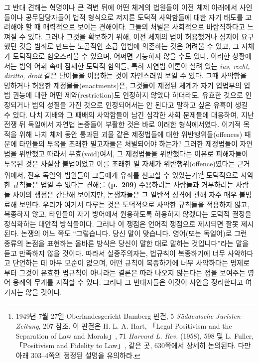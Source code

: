 그 반대 견해는 혁명이나 큰 격변 뒤에 어떤 체계의 법원들이 이전 체제
아래에서 사인들이나 공무담당자들이 법적 형식으로 저지른 도덕적
사악함들에 대한 자기 태도를 고려해야 할 때 매력적으로 보이는 견해이다.
그들의 처벌은 사회적으로 바람직하다고 느껴질 수 있다. 그러나 그것을
확보하기 위해, 이전 체제의 법이 허용했거나 심지어 요구했던 것을 범죄로
만드는 노골적인 소급 입법에 의존하는 것은 어려울 수 있고, 그 자체가
도덕적으로 혐오스러울 수 있으며, 어쩌면 가능하지 않을 수도 있다. 이러한
상황에서는 법의 어휘 속에 잠재한 도덕적 함의들, 특히 자연법 이론이 실려
있는 \emph{ius, recht, diritto, droit} 같은 단어들을 이용하는 것이
자연스러워 보일 수 있다. 그때 사악함을 명하거나 허용한
제정물들(enactments)은, 그것들이 제정된 체계가 자기 입법부의 입법 권능에
대한 어떤 제약(restriction)도 인정하지 않았다 하더라도, 유효한 것으로
인정되거나 법의 성질을 가진 것으로 인정되어서는 안 된다고 말하고 싶은
유혹이 생길 수 있다. 나치 지배와 그 패배의 사악함들이 남긴 심각한 사회
문제들에 대응하여, 지난 전쟁 뒤 독일에서 자연법 논증들이 부활한 것은
바로 이러한 형식에서였다. 이기적 목적을 위해 나치 체제 동안 통과된 괴물
같은 제정법들에 대한 위반행위들(offences) 때문에 타인들의 투옥을 초래한
밀고자들은 처벌되어야 하는가? 그러한 제정법들이 자연법을 위반했고 따라서
무효(void)여서, 그 제정법들을 위반했다는 이유로 피해자들이 투옥된 것은
사실상 불법이었고 이를 초래한 일 자체가 위반행위(offence)였다는 근거
위에서, 전후 독일의 법원들이 그들에게 유죄를 선고할 수
있었는가?\footnote{1949년 7월 27일 Oberlandesgericht Bamberg 판결, 5
  \emph{Süddeutsche Juristen-Zeitung}, 207 참조. 이 판결은 H. L. A.
  Hart, 「Legal Positivism and the Separation of Law and Morals」, 71
  \emph{Harvard L. Rev.} (1958), 598 및 L. Fuller, 「Positivism and
  Fidelity to Law」, 같은 곳, 630쪽에서 상세히 논의된다. 다만 아래
  303--4쪽의 정정된 설명을 유의하라.} 도덕적으로 사악한 규칙들은 법일 수
없다는 견해를 \textbf{(p.~209)} 수용하려는 사람들과 거부하려는 사람들
사이의 쟁점은 간단해 보이지만, 논쟁자들은 그 일반적 성격에 관해 자주
매우 불명료해 보인다. 우리가 여기서 다루는 것은 도덕적으로 사악한
규칙들을 적용하지 않고, 복종하지 않고, 타인들이 자기 방어에서 원용하도록
허용하지 않겠다는 도덕적 결정을 정식화하는 대안적 방식들이다. 그러나 이
쟁점은 언어적 쟁점으로 제시되면 잘못 제시된다. 논쟁의 어느 쪽도
“그렇습니다. 당신 말이 맞습니다. 영어(또는 독일어)로 그런 종류의 논점을
표현하는 올바른 방식은 당신이 말한 대로 말하는 것입니다”라는 말을 듣고
만족하지 않을 것이다. 따라서 실증주의자는, 법규칙이 복종하기에 너무
사악하다고 단언하는 데 아무 모순이 없으며, 어떤 규칙이 복종하기에 너무
사악하다는 명제로부터 그것이 유효한 법규칙이 아니라는 결론은 따라 나오지
않는다는 점을 보여주는 영어 용례의 무게를 지적할 수 있다. 그러나 그
반대자들은 이것이 사안을 정리한다고 여기지는 않을 것이다.

